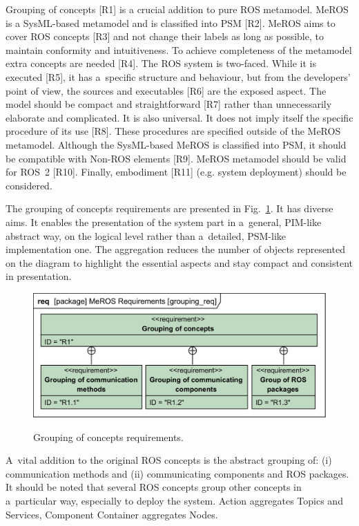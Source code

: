 \documentclass[11pt,oneside,a4paper]{report}
\begin{document}
	Grouping of concepts [R1] is a crucial addition to pure ROS metamodel. 
	MeROS is a  SysML-based metamodel and is classified into PSM [R2].
	 MeROS aims to cover ROS concepts [R3] and not change their labels as long as possible, to maintain conformity and intuitiveness. To achieve completeness of the metamodel extra concepts are needed [R4]. The ROS system is two-faced. While it is executed [R5], it has a~specific structure and behaviour, but from the developers' point of view, the sources and executables [R6] are the exposed aspect. The model should be compact and straightforward [R7] rather than unnecessarily elaborate and complicated. It is also universal. It does not imply itself the specific procedure of its use [R8]. These procedures are specified outside of the MeROS metamodel. Although the SysML-based MeROS is classified into PSM, it should be compatible with Non-ROS elements [R9]. MeROS metamodel should be valid for ROS~2 [R10]. Finally, embodiment [R11] (e.g. system deployment) should be considered.
	
	The grouping of concepts requirements are presented in Fig.~\ref{fig:grouping_req}. It has diverse aims. It enables the presentation of the system part in a~general, PIM-like abstract way, on the logical level rather than a~detailed, PSM-like implementation one. The aggregation reduces the number of objects represented on the diagram to highlight the essential aspects and stay compact and consistent in presentation.
	
	\begin{figure}[H]
		\centering
		\begin{center}
			{\includegraphics[scale=1.0]{diagrams/grouping_req.png}}
		\end{center}
		\caption{Grouping of concepts requirements.} 
		\label{fig:grouping_req}
	\end{figure}
	
	A~vital addition to the original ROS concepts is the abstract grouping of:  (i) communication methods and (ii) communicating components and ROS packages.  It should be noted that several ROS concepts group other concepts in a~particular way, especially to deploy the system. Action aggregates Topics and Services, Component Container aggregates Nodes.
\end{document}
